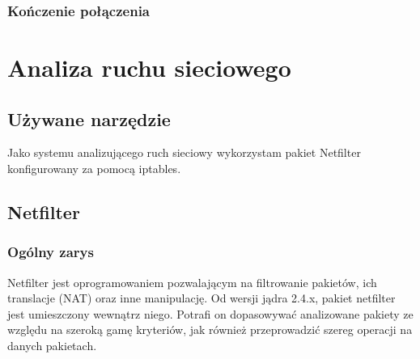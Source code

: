 \documentclass[a4paper,12pt,oneside]{book}
\begin{document}
		\subsection{Kończenie połączenia}
			
\chapter{Analiza ruchu sieciowego}
	\section{Używane narzędzie}
		Jako systemu analizującego ruch sieciowy wykorzystam pakiet Netfilter konfigurowany za pomocą iptables.
	\section{Netfilter}
		\subsection{Ogólny zarys}
			Netfilter jest oprogramowaniem pozwalającym na filtrowanie pakietów, ich translacje (NAT) oraz inne manipulację.
			Od wersji jądra 2.4.x, pakiet netfilter jest umieszczony wewnątrz niego.
			Potrafi on dopasowywać analizowane pakiety ze względu na szeroką gamę kryteriów, jak również przeprowadzić szereg operacji na danych pakietach.
\end{document}
